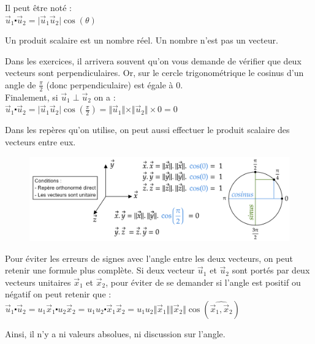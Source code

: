 \documentclass[
	11pt, %
	fleqn, %
	a4paper, %
]{LegrandOrangeBook}
\begin{document}
Il peut être noté : \\
$\Vec{u}_1 \centerdot \Vec{u}_2 = \vert \Vec{u}_1 \Vec{u}_2 \vert \cos(\theta)$

Un produit scalaire est un nombre réel. Un nombre n'est pas un vecteur.

\begin{theorem}
    Dans les exercices, il arrivera souvent qu'on vous demande de vérifier que deux vecteurs sont perpendiculaires. Or, sur le cercle trigonométrique le cosinus d'un angle de $\frac{\pi}{2}$ (donc perpendiculaire) est égale à 0. \\
    Finalement, si $\Vec{u}_1 \perp \Vec{u}_2$ on a : \\
    $\Vec{u}_1 \centerdot \Vec{u}_2= \vert \Vec{u}_1 \Vec{u}_2 \vert \cos(\frac{\pi}{2}) = \Vert \Vec{u}_1 \Vert \times \Vert \Vec{u}_2 \Vert \times 0 = 0 $
\end{theorem}

Dans les repères qu'on utilise, on peut aussi effectuer le produit scalaire des vecteurs entre eux.

\begin{figure}[H] %
	\centering %
	\includegraphics[width=1\textwidth]{Images/sca2.png} %
\end{figure}

Pour éviter les erreurs de signes avec l'angle entre les deux vecteurs, on peut retenir une formule plus complète.
Si deux vecteur $\Vec{u}_1$ et $\Vec{u}_2$ sont portés par deux vecteurs unitaires $\Vec{x}_1$ et $\Vec{x}_2$, pour éviter de se demander si l'angle est positif ou négatif on peut retenir que : \\
$\Vec{u}_1 \centerdot \Vec{u}_2 = u_1 \Vec{x}_1 \centerdot u_2 \Vec{x}_2 =  u_1 u_2 \centerdot \Vec{x}_1 \Vec{x}_2 = u_1 u_2 \Vert \Vec{x}_1 \Vert \Vert \Vec{x}_2 \Vert \cos ( \widehat{\Vec{x}_1, \Vec{x}_2} ) $

Ainsi, il n’y a ni valeurs absolues, ni discussion sur l’angle.
\end{document}
